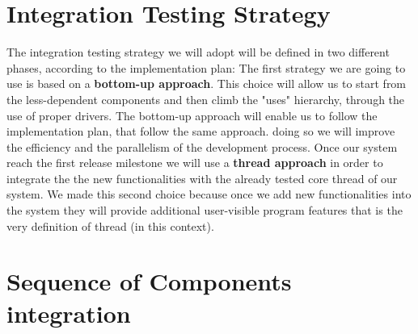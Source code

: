 \section{Integration Testing Strategy}
The integration testing strategy we will adopt will be defined in two different phases, according to the  implementation plan:
The first strategy we are going to use is based on a \textbf{bottom-up approach}. This choice will allow us to start from the less-dependent components and then climb the "uses" hierarchy, through the use of proper drivers. The bottom-up approach will enable us to follow the implementation plan, that follow the same approach. doing so we will improve the efficiency and the parallelism of the development process. \newline
Once our system reach the first release milestone we will use a \textbf{thread approach} in order to integrate the the new functionalities with the already tested core thread of our system. We made this second choice because once we add new functionalities into the system they will provide additional user-visible program features that is the very definition of thread (in this context). 
\section{Sequence of Components integration}


